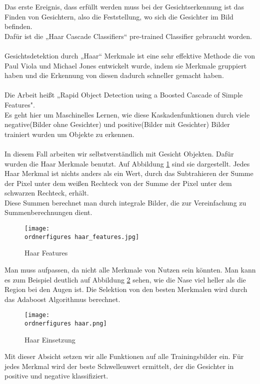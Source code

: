 Das erste Ereignis, dass erfüllt werden muss bei der Gesichtserkennung ist das Finden von Gesichtern, also die Feststellung, wo sich die Gesichter im Bild befinden. \\ 
Dafür ist die „Haar Cascade Classifiers“  pre-trained Classifier gebraucht worden. \\ \\
Gesichtsdetektion durch „Haar“ Merkmale ist eine sehr effektive Methode die von Paul Viola und Michael Jones entwickelt wurde, indem sie Merkmale gruppiert haben und die Erkennung von diesen dadurch schneller gemacht haben. \\ \\
Die Arbeit heißt „Rapid Object Detection using a Boosted Cascade of Simple Features". \cite{Viola01robustreal-time}\\

Es geht hier um Maschinelles Lernen, wie diese Kaskadenfunktionen durch viele negative(Bilder ohne Gesichter) und positive(Bilder mit Gesichter) Bilder trainiert wurden um Objekte zu erkennen.\\ \\
In diesem Fall  arbeiten wir selbstverständlich mit Gesicht Objekten. 
Dafür wurden die Haar Merkmale benutzt. Auf Abbildung \ref{fig:haar features} sind sie dargestellt. Jedes Haar Merkmal ist nichts anders als ein Wert, durch das Subtrahieren der Summe der Pixel unter dem weißen Rechteck von der Summe der Pixel unter dem schwarzen Rechteck, erhält. \\
Diese Summen berechnet man durch integrale Bilder, die zur Vereinfachung zu Summenberechnungen dient.
\begin{figure}[H]
	\texttt{[image: \\ordnerfigures haar\_features.jpg]}
	\caption{Haar Features}
	\label{fig:haar features}
	\cite{Viola01robustreal-time}
\end{figure}

Man muss aufpassen, da nicht alle Merkmale von Nutzen sein könnten. Man kann es zum Beispiel deutlich auf Abbildung \ref*{fig:haar} sehen, wie die Nase viel heller als die Region bei den Augen ist. Die Selektion von den besten Merkmalen wird durch das Adaboost Algorithmus berechnet. 
\begin{figure}[H]
	\texttt{[image: \\ordnerfigures haar.png]}
	\caption{Haar Einsetzung}
	\label{fig:haar}
\end{figure}\cite{Viola01robustreal-time}

Mit dieser Absicht setzen wir alle Funktionen auf alle Trainingsbilder ein. Für jedes Merkmal wird der beste Schwellenwert ermittelt, der die Gesichter in positive und negative klassifiziert.\\\\

